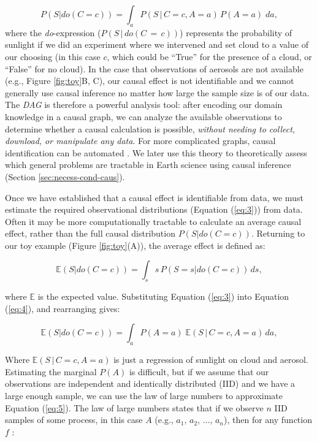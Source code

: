 \documentclass[12pt]{article}
\begin{document}
\begin{equation} P(S | do(C = c)) = \int_{a} P(S \, | \, C = c, A=a)
  \, P(A=a) \; da,
  \label{eq:3}
\end{equation} where the \textit{do}-expression ($P(S \, | \, do(C\, = \,c))$) represents the probability of sunlight
if we did an experiment where we intervened and set cloud to a value
of our choosing (in this case $c$, which could be ``True'' for the
presence of a cloud, or ``False'' for no cloud). In the case that
observations of aerosols are not available (e.g., Figure
\ref{fig:toy}B, C), our causal effect is not identifiable and we
cannot generally  use causal inference no matter how large the sample size is of our
data. The \emph{DAG} is therefore a powerful analysis tool: after encoding
our domain knowledge in a causal graph, we can analyze the available
observations to determine whether a causal calculation is possible,
\textit{without needing to collect, download, or manipulate any
  data}. For more complicated graphs, causal identification can be
automated \citep[][ \url{http://www.dagitty.net/}]{shpitser2006,
  textor2017}. We later use this theory to theoretically assess which
general problems are tractable in Earth science using causal inference
(Section \ref{sec:necess-cond-caus}).

Once we have established that a causal effect is identifiable from
data, we must estimate the required observational distributions
(Equation (\ref{eq:3})) from data. Often it may be more
computationally tractable to calculate an average causal effect,
rather than the full causal distribution $P(S | do(C=c))$. Returning
to our toy example (Figure \ref{fig:toy}(A)), the average effect is
defined as:

\begin{equation} \mathbb{E}(S | do(C = c)) = \int_{s} s \, P(S = s |
  do(C=c)) \, ds,
  \label{eq:4}
\end{equation}

where $\mathbb{E}$ is the expected value. Substituting Equation
(\ref{eq:3}) into Equation (\ref{eq:4}), and rearranging gives:

\begin{equation} \mathbb{E}(S | do(C = c)) = \int_{a} P(A=a) \;
  \mathbb{E}(S \, | \, C=c, A=a) \, d a,
  \label{eq:5}
\end{equation}

Where $\mathbb{E}(S \, | \, C=c, A=a)$ is just a regression of
sunlight on cloud and aerosol. Estimating the marginal $P(A)$ is
difficult, but if we assume that our observations are independent and
identically distributed (IID) and we have a large enough sample, we
can use the law of large numbers to approximate Equation
(\ref{eq:5}). The law of large numbers states that if we observe $n$
IID samples of some process, in this case $A$ (e.g., $a_1$, $a_2$,
$\ldots$, $a_n$), then for any function $f$ \citep{shalizi2013}:
\end{document}
